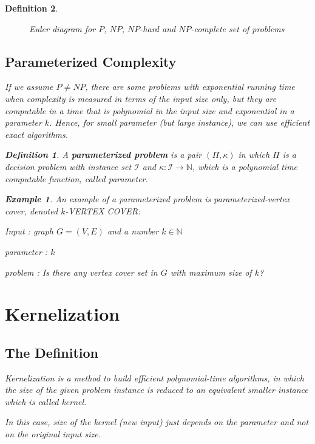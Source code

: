 \documentclass[12pt]{article}
\theoremstyle{slplain}
\newtheorem{defi}{Definition}
\newtheorem{exam}{Example}
\begin{document}
\begin{defi}
\begin{figure}[!ht]
\caption{\tiny Euler diagram for $P$, $NP$, $NP$-hard and $NP$-complete set of problems}\label{fig}
\end{figure}

\newpage
\subsection{Parameterized Complexity}

If we assume $P \not = NP$, there are some problems with exponential running time when complexity is measured in terms of the input size only, but they are computable in a time that is polynomial in the input size and exponential in a parameter $k$. Hence, for small parameter (but large instance), we can use efficient exact algorithms. 

\begin{defi}
A {\bf parameterized problem} is a pair $(\Pi, \kappa)$ in which $\Pi$ is a
decision problem with instance set $\mathcal{I}$ and $\kappa : \mathcal{I} \to \mathbb{N}$, which is a polynomial
time computable function, called parameter.
\end{defi}

\begin{exam}
An example of a parameterized problem is parameterized-vertex cover, denoted $k$-VERTEX COVER:

Input : graph $G = (V, E)$ and a number $k \in \mathbb{N}$

parameter : $k$

problem : Is there any vertex cover set in $G$ with maximum size of $k$?
\end{exam}






\newpage

\section{Kernelization}
\subsection{The Definition}
Kernelization is a method to build efficient polynomial-time algorithms, 
in which the size of the given problem instance is reduced to an equivalent smaller instance which is called kernel. 

In this case, size of the kernel (new input) just depends on the parameter and not on the original input size. 


\end{defi}
\end{document}
